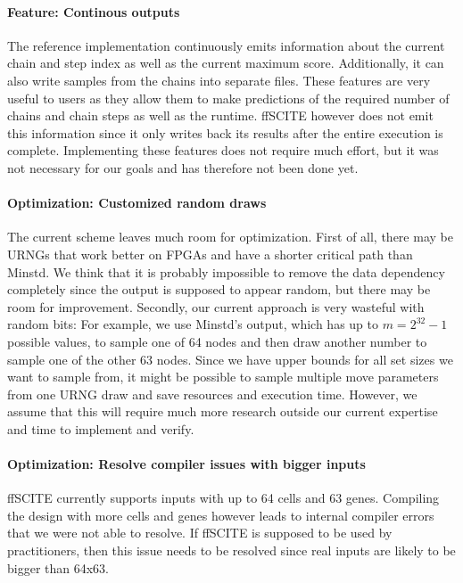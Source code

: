 \paragraph{Feature: Continous outputs}
The reference implementation continuously emits information about the current chain and step index as well as the current maximum score. Additionally, it can also write samples from the chains into separate files. These features are very useful to users as they allow them to make predictions of the required number of chains and chain steps as well as the runtime. \ac{ffSCITE} however does not emit this information since it only writes back its results after the entire execution is complete. Implementing these features does not require much effort, but it was not necessary for our goals and has therefore not been done yet.

\paragraph{Optimization: Customized random draws}
The current scheme leaves much room for optimization. First of all, there may be \acp{URNG} that work better on \acp{FPGA} and have a shorter critical path than Minstd. We think that it is probably impossible to remove the data dependency completely since the output is supposed to appear random, but there may be room for improvement. Secondly, our current approach is very wasteful with random bits: For example, we use Minstd's output, which has up to $m = 2^{32} - 1$ possible values, to sample one of 64 nodes and then draw another number to sample one of the other 63 nodes. Since we have upper bounds for all set sizes we want to sample from, it might be possible to sample multiple move parameters from one \ac{URNG} draw and save resources and execution time. However, we assume that this will require much more research outside our current expertise and time to implement and verify.

\paragraph{Optimization: Resolve compiler issues with bigger inputs}
\ac{ffSCITE} currently supports inputs with up to 64 cells and 63 genes. Compiling the design with more cells and genes however leads to internal compiler errors that we were not able to resolve. If \ac{ffSCITE} is supposed to be used by practitioners, then this issue needs to be resolved since real inputs are likely to be bigger than 64x63.

